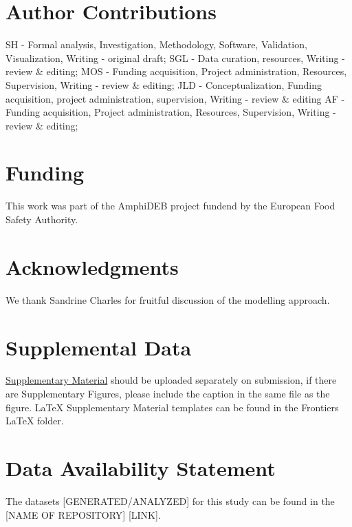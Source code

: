 \documentclass[utf8]{FrontiersinHarvard} %
\begin{document}
\section*{Author Contributions}

SH - Formal analysis, Investigation, Methodology, Software, Validation, Visualization, Writing - original draft;
SGL - Data curation, resources, Writing - review \& editing;
MOS - Funding acquisition, Project administration, Resources, Supervision, Writing - review \& editing;
JLD - Conceptualization, Funding acquisition, project administration, supervision, Writing - review \& editing
AF - Funding acquisition, Project administration, Resources, Supervision, Writing - review \& editing;

\section*{Funding}
This work was part of the AmphiDEB project fundend by the European Food Safety Authority.

\section*{Acknowledgments}
We thank Sandrine Charles for fruitful discussion of the modelling approach.

\section*{Supplemental Data}
 \href{http://home.frontiersin.org/about/author-guidelines#SupplementaryMaterial}{Supplementary Material} should be uploaded separately on submission, if there are Supplementary Figures, please include the caption in the same file as the figure. LaTeX Supplementary Material templates can be found in the Frontiers LaTeX folder.

\section*{Data Availability Statement}
The datasets [GENERATED/ANALYZED] for this study can be found in the [NAME OF REPOSITORY] [LINK].


\end{document}
